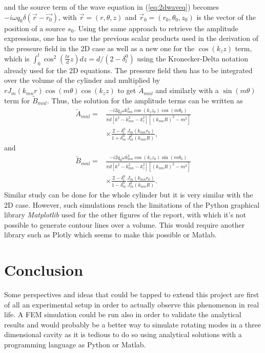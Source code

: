 \documentclass[%
 reprint,
 amsmath,amssymb,
 aps,
]{revtex4-2}
\begin{document}
and the source term of the wave equation in (\ref{eq:2dwaveq}) becomes $-i\omega q_0 \delta(\vec{r} - \vec{r_0})$, with $\vec{r} = (r, \theta, z)$ and $\vec{r}_0 = (r_0, \theta_0, z_0)$ is the vector of the position of a source $s_0$. Using the same approach to retrieve the amplitude expressions, one has to use the previous scalar products used in the derivation of the pressure field in the 2D case as well as a new one for the $\cos(k_z z)$ term, which is $\int_0^l \cos^2\left( \frac{l \pi}{d}z \right) dz = d/(2 - \delta_l^0)$ using the Kronecker-Delta notation already used for the 2D equations. The pressure field then has to be integrated over the volume of the cylinder and multiplied by $r J_m(k_{mn}r) \cos(m\theta) \cos(k_z z)$ to get $\tilde{A}_{mnl}$ and similarly with a $\sin(m\theta)$ term for $\tilde{B}_{mnl}$. Thus, the solution for the amplitude terms can be written as 
\begin{equation}
    \begin{split}
        \tilde{A}_{mnl} = &\frac{- i 2 q_0 \omega k^2_{mn} \cos(k_z z_0) \cos(m \theta_0)}{\pi d\left[k^2 - k^2_{mn} - k^2_z \right] \left[(k_{mn}R)^2 - m^2 \right]}\\  &\times \frac{2 - \delta_l^0}{1 + \delta_m^0} \frac{J_m(k_{mn}r_0)}{J^2_{m}(k_{mn}R)},
    \end{split}
\end{equation}
and
\begin{equation}
    \begin{split}
        \tilde{B}_{mnl} = &\frac{- i 2 q_0 \omega k^2_{mn} \cos(k_z z_0) \sin(m \theta_0)}{\pi d\left[k^2 - k^2_{mn} - k^2_z \right] \left[(k_{mn}R)^2 - m^2 \right]}\\  &\times \frac{2 - \delta_l^0}{1 - \delta_m^0} \frac{J_m(k_{mn}r_0)}{J^2_{m}(k_{mn}R)}.
    \end{split}
\end{equation}
Similar study can be done for the whole cylinder but it is very similar with the 2D case. However, such simulations reach the limitations of the Python graphical library \emph{Matplotlib} used for the other figures of the report, with which it's not possible to generate contour lines over a volume. This would require another library such as Plotly which seems to make this possible or Matlab.

\section{Conclusion}
Some perspectives and ideas that could be tapped to extend this project are first of all an experimental setup in order to actually observe this phenomenon in real life. A FEM simulation could be run also in order to validate the analytical results and would probably be a better way to simulate rotating modes in a three dimensional cavity as it is tedious to do so using analytical solutions with a programming language as Python or Matlab.
\end{document}
